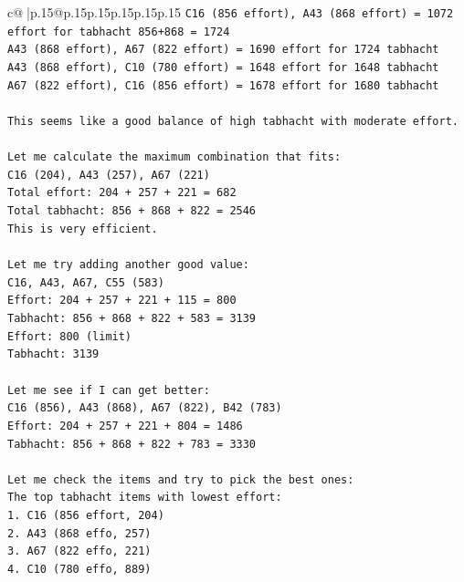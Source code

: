 \documentclass{article}
\begin{document}
{\begin{supertabular}{c@{$\;$}|p{.15\linewidth}@{}p{.15\linewidth}p{.15\linewidth}p{.15\linewidth}p{.15\linewidth}p{.15\linewidth}}
{{{\texttt{C16 (856 effort), A43 (868 effort) = 1072 effort for tabhacht 856+868 = 1724} \\
\texttt{A43 (868 effort), A67 (822 effort) = 1690 effort for 1724 tabhacht} \\
\texttt{A43 (868 effort), C10 (780 effort) = 1648 effort for 1648 tabhacht} \\
\texttt{A67 (822 effort), C16 (856 effort) = 1678 effort for 1680 tabhacht} \\
\\ 
\texttt{This seems like a good balance of high tabhacht with moderate effort.} \\
\\ 
\texttt{Let me calculate the maximum combination that fits:} \\
\texttt{C16 (204), A43 (257), A67 (221)} \\
\texttt{Total effort: 204 + 257 + 221 = 682} \\
\texttt{Total tabhacht: 856 + 868 + 822 = 2546} \\
\texttt{This is very efficient.} \\
\\ 
\texttt{Let me try adding another good value:} \\
\texttt{C16, A43, A67, C55 (583)} \\
\texttt{Effort: 204 + 257 + 221 + 115 = 800} \\
\texttt{Tabhacht: 856 + 868 + 822 + 583 = 3139} \\
\texttt{Effort: 800 (limit)} \\
\texttt{Tabhacht: 3139} \\
\\ 
\texttt{Let me see if I can get better:} \\
\texttt{C16 (856), A43 (868), A67 (822), B42 (783)} \\
\texttt{Effort: 204 + 257 + 221 + 804 = 1486} \\
\texttt{Tabhacht: 856 + 868 + 822 + 783 = 3330} \\
\\ 
\texttt{Let me check the items and try to pick the best ones:} \\
\texttt{The top tabhacht items with lowest effort:} \\
\texttt{1. C16 (856 effort, 204)} \\
\texttt{2. A43 (868 effo, 257) } \\
\texttt{3. A67 (822 effo, 221)} \\
\texttt{4. C10 (780 effo, 889)} \\
}}}
\end{supertabular}}
\end{document}
